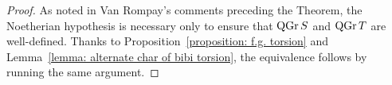 \begin{proof}
  As noted in Van Rompay's comments preceding the Theorem, the Noetherian hypothesis is necessary only to ensure that \(\operatorname{QGr}S\) and \(\operatorname{QGr}T\) are well-defined.
  Thanks to Proposition~\ref{proposition: f.g. torsion} and Lemma~\ref{lemma: alternate char of bibi torsion}, the equivalence follows by running the same argument.
\end{proof}
